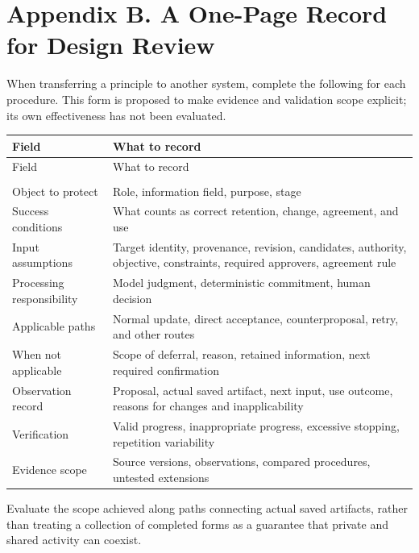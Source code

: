 \documentclass[10pt,a4paper]{article}
\newlength{\usable}
\begin{document}
\section{Appendix B. A One-Page Record for Design Review}\label{two-role-failure-design-appendix-b.-a-one-page-record-for-design-review}

When transferring a principle to another system, complete the following for each procedure. This form is proposed to make evidence and validation scope explicit; its own effectiveness has not been evaluated.

\Needspace{115pt}
\begingroup\fontsize{9.1}{12}\selectfont\setlength{\parskip}{1pt}
\setlength{\usable}{\dimexpr\linewidth-2\tabcolsep\relax}
\begin{longtable}{@{}>{\raggedright\arraybackslash}p{0.27\usable}>{\raggedright\arraybackslash}p{0.73\usable}@{}}
\toprule
Field & What to record \\
\midrule\endfirsthead
\toprule
Field & What to record \\
\midrule\endhead
\midrule
\multicolumn{2}{r}{\scriptsize Continued on the next page}\\\endfoot
\bottomrule\endlastfoot
Object to protect & Role, information field, purpose, stage \\
Success conditions & What counts as correct retention, change, agreement, and use \\
Input assumptions & Target identity, provenance, revision, candidates, authority, objective, constraints, required approvers, agreement rule \\
Processing responsibility & Model judgment, deterministic commitment, human decision \\
Applicable paths & Normal update, direct acceptance, counterproposal, retry, and other routes \\
When not applicable & Scope of deferral, reason, retained information, next required confirmation \\
Observation record & Proposal, actual saved artifact, next input, use outcome, reasons for changes and inapplicability \\
Verification & Valid progress, inappropriate progress, excessive stopping, repetition variability \\
Evidence scope & Source versions, observations, compared procedures, untested extensions \\
\end{longtable}\endgroup

Evaluate the scope achieved along paths connecting actual saved artifacts, rather than treating a collection of completed forms as a guarantee that private and shared activity can coexist.
\end{document}
